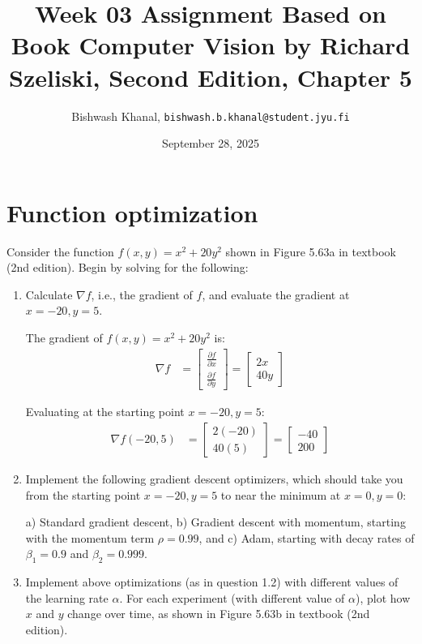 \documentclass[12pt,a4paper]{article}
\title{Week 03 Assignment Based on Book Computer Vision by Richard Szeliski, Second Edition, Chapter 5}
\author{Bishwash Khanal, \texttt{bishwash.b.khanal@student.jyu.fi}}
\date{September 28, 2025}
\begin{document}
\maketitle

\section{Function optimization}

Consider the function $f(x,y) = x^{2} + 20 y^{2}$ shown in Figure 5.63a in textbook (2nd edition). Begin by solving for the following:

\begin{enumerate}
    \item Calculate $\nabla f$, i.e., the gradient of $f$, and evaluate the gradient at $x = -20, y = 5$.

    The gradient of $f(x,y) = x^2 + 20y^2$ is:
\begin{align}
\nabla f &= \begin{bmatrix} \frac{\partial f}{\partial x} \\ \frac{\partial f}{\partial y} \end{bmatrix} = \begin{bmatrix} 2x \\ 40y \end{bmatrix}
\end{align}

Evaluating at the starting point $x = -20, y = 5$:
\begin{align}
\nabla f(-20, 5) &= \begin{bmatrix} 2(-20) \\ 40(5) \end{bmatrix} = \begin{bmatrix} -40 \\ 200 \end{bmatrix}
\end{align}

    \item Implement the following gradient descent optimizers, which should take you from the starting point $x= -20, y= 5$ to near the minimum at $x= 0, y= 0$:

    a) Standard gradient descent, b) Gradient descent with momentum, starting with the momentum term $\rho = 0.99$, and c) Adam, starting with decay rates of $\beta_{1}=0.9$ and $\beta_{2}=0.999$.
    \newpage
    \item Implement above optimizations (as in question 1.2) with different values of the learning rate $\alpha$. For each experiment (with different value of $\alpha$), plot how $x$ and $y$ change over time, as shown in Figure 5.63b in textbook (2nd edition).
    

\end{enumerate}
\end{document}
